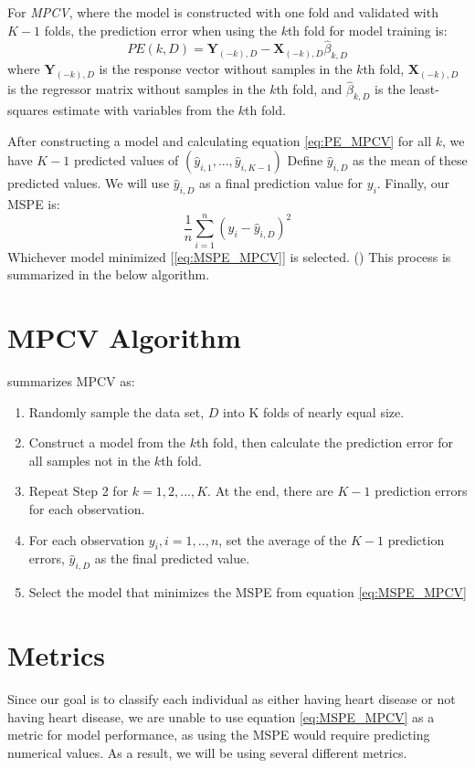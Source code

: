 \documentclass[letter]{article}
\begin{document}
For \textit{MPCV}, where the model is constructed with one fold and validated with \(K-1\) folds, the prediction error when using the \(k\)th fold for model training is:
\begin{equation}\label{eq:PE_MPCV}
	PE(k,D) = \textbf{Y}_{(-k),D}-\textbf{X}_{(-k),D}\hat \beta_{k,D}
\end{equation}
where \(\textbf{Y}_{(-k),D}\) is the response vector without samples in the \(k\)th fold, \(\textbf{X}_{(-k),D}\) is the regressor matrix without samples in the \(k\)th fold, and \(\hat \beta_{k,D}\) is the least-squares estimate with variables from the \(k\)th fold.

After constructing a model and calculating equation \ref{eq:PE_MPCV} for all \(k\), we have \(K-1\) predicted values of \((\hat{y}_{i,1},..., \hat{y}_{i,K-1})\)
Define \(\hat{y}_{i,D}\) as the mean of these predicted values.  We will use \(\hat{y}_{i,D}\) as a final prediction value for \(y_i\).  Finally, our MSPE is:
\begin{equation}\label{eq:MSPE_MPCV}
	\frac{1}{n}\sum_{i=1}^{n}(y_i-\hat y_{i,D})^2
\end{equation}
Whichever model minimized [\ref{eq:MSPE_MPCV}] is selected.  (\citep{yoonsuhmulpred}) This process is summarized in the below algorithm.

\section{MPCV Algorithm}
\citep{yoonsuhmulpred} summarizes MPCV as:
\begin{enumerate}
	\item Randomly sample the data set, \(D\) into K folds of nearly equal size.
	\item Construct a model from the \(k\)th fold, then calculate the prediction error for all samples not in the \(k\)th fold.
	\item Repeat Step 2 for \(k=1, 2, ..., K\).  At the end, there are \(K-1\) prediction errors for each observation.
	\item For each observation \(y_i, i=1,..,n\), set the average of the \(K-1\) prediction errors, \(\hat y_{i,D}\) as the final predicted value.
	\item Select the model that minimizes the MSPE from equation \ref{eq:MSPE_MPCV}
\end{enumerate}

\section{Metrics}
Since our goal is to classify each individual as either having heart disease or not having heart disease, we are unable to use equation \ref{eq:MSPE_MPCV}
as a metric for model performance, as using the MSPE would require predicting numerical values.  As a result, we will be using several different metrics.
\end{document}
